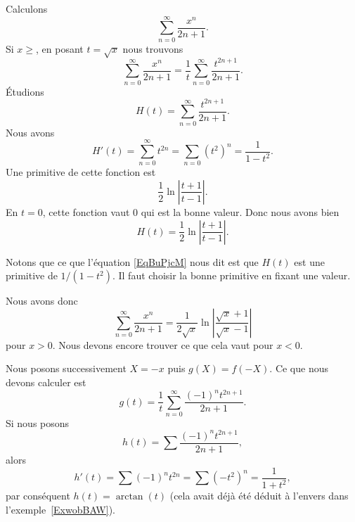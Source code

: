 \begin{example}
	Calculons
	\begin{equation}
		\sum_{n=0}^{\infty}\frac{ x^n }{ 2n+1 }.
	\end{equation}
	Si \( x\geq\), en posant \( t=\sqrt{x}\) nous trouvons
	\begin{equation}
		\sum_{n=0}^{\infty}\frac{ x^n }{ 2n+1 }=\frac{1}{ t }\sum_{n=0}^{\infty}\frac{ t^{2n+1} }{ 2n+1 }.
	\end{equation}
	Étudions
	\begin{equation}
		H(t)=\sum_{n=0}^{\infty}\frac{ t^{2n+1} }{ 2n+1 }.
	\end{equation}
	Nous avons
	\begin{equation}     \label{EqBuPjcM}
		H'(t)=\sum_{n=0}^{\infty}t^{2n}=\sum_{n=0}(t^2)^n=\frac{1}{ 1-t^2 }.
	\end{equation}
	Une primitive de cette fonction est
	\begin{equation}
		\frac{ 1 }{2}\ln\left| \frac{ t+1 }{ t-1 } \right|.
	\end{equation}
	En \( t=0\), cette fonction vaut \( 0\) qui est la bonne valeur. Donc nous avons bien
	\begin{equation}
		H(t)=\frac{ 1 }{2}\ln\left| \frac{ t+1 }{ t-1 } \right|.
	\end{equation}

	Notons que ce que l'équation \eqref{EqBuPjcM} nous dit est que \( H(t)\) est une primitive de \( 1/(1-t^2)\). Il faut choisir la bonne primitive en fixant une valeur.

	Nous avons donc
	\begin{equation}
		\sum_{n=0}^{\infty}\frac{ x^n }{ 2n+1 }=\frac{ 1 }{2\sqrt{x}}\ln\left| \frac{ \sqrt{x}+1 }{ \sqrt{x}-1 } \right|
	\end{equation}
	pour \( x>0\). Nous devons encore trouver ce que cela vaut pour \( x<0\).

	Nous posons successivement \( X=-x\) puis \( g(X)=f(-X)\). Ce que nous devons calculer est
	\begin{equation}
		g(t)=\frac{1}{ t }\sum_{n=0}^{\infty}\frac{ (-1)^nt^{2n+1} }{ 2n+1 }.
	\end{equation}
	Si nous posons
	\begin{equation}
		h(t)=\sum \frac{ (-1)^nt^{2n+1} }{ 2n+1 },
	\end{equation}
	alors
	\begin{equation}
		h'(t)=\sum (-1)^nt^{2n}=\sum (-t^2)^n=\frac{1}{ 1+t^2 },
	\end{equation}
	par conséquent \( h(t)=\arctan(t)\) (cela avait déjà été déduit à l'envers dans l'exemple~\ref{ExwobBAW}).


\end{example}
